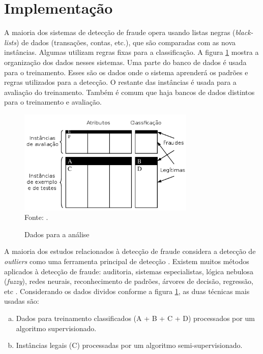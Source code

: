 \section{Implementação}

A maioria dos sistemas de detecção de fraude opera usando listas negras (\emph{black-lists}) de dados (transações, contas, etc.), que são comparadas com as nova instâncias. Algumas utilizam regras fixas para a classificação. A figura \ref{fig:fraud_data} mostra a organização dos dados nesses sistemas. Uma parte do banco de dados é usada para o treinamento. Esses são os dados onde o sistema aprenderá os padrões e regras utilizados para a detecção. O restante das instâncias é usada para a avaliação do treinamento. Também é comum que haja bancos de dados distintos para o treinamento e avaliação.

\begin{figure}[h!]
    \centering
    \caption{Dados para a análise}
    \label{fig:fraud_data}
    \includegraphics[width=0.75\textwidth]{img/fraud-data.png}
    \\ Fonte: \cite{Phua2010}.
\end{figure}

A maioria dos estudos relacionados à detecção de fraude considera a detecção de \emph{outliers} como uma ferramenta principal de detecção \cite{Aral2011}. Existem muitos métodos aplicados à detecção de fraude: auditoria, sistemas especialistas, lógica nebulosa (\emph{fuzzy}), redes neurais, reconhecimento de padrões, árvores de decisão, regressão, etc \cite{Huang2010}. Considerando os dados dividos conforme a figura \ref{fig:fraud_data}, as duas técnicas mais usadas são:

\begin{enumerate}[a)]
\item Dados para treinamento classificados (A + B + C + D) processados por um algoritmo supervisionado.
\item Instâncias legais (C) processadas por um algoritmo semi-supervisionado.
\end{enumerate}

